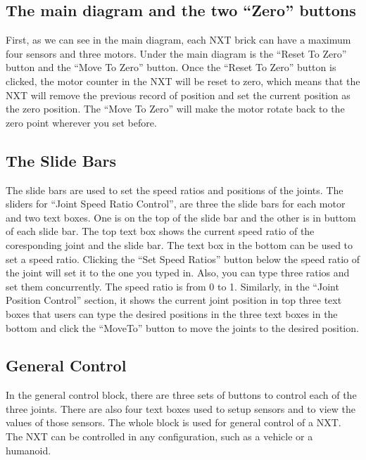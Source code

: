 \documentclass[11pt]{article}
\begin{document}
\subsection{The main diagram and the two ``Zero'' buttons
\label{sec:gui_maindiagram}}
First, as we can see in the main diagram, each NXT brick can have a maximum four
sensors and three motors. Under the main diagram is the ``Reset To Zero'' button
and the ``Move To Zero'' button. Once the ``Reset To Zero'' button is clicked, the
motor counter in the NXT will be reset to zero, which means that the NXT will 
remove the previous record of position and set the current position as the zero
position. The ``Move To Zero'' will make the motor rotate back to the zero point
wherever you set before. 

\subsection{The Slide Bars\label{sec:gui_speedjoint}}
The slide bars are used to set the speed ratios and positions of the joints. The
sliders for ``Joint Speed Ratio Control'', are three the slide bars for each motor 
and two text boxes. One is on the top of the slide bar and the other is in buttom 
of each slide bar. The top text box shows the current speed ratio of the 
coresponding joint and the slide bar. The text box in the bottom can be used to 
set a speed ratio. Clicking the ``Set Speed Ratios'' button below the speed ratio 
of the joint will set it to the one you typed in. Also, you can type three ratios 
and set them concurrently. The speed ratio is from 0 to 1. Similarly, in the 
``Joint Position Control'' section, it shows the current joint position in top three 
text boxes that users can type the desired positions in the three text boxes in 
the bottom and click the ``MoveTo'' button to move the joints to the desired position.

\subsection{General Control\label{sec:gui_generalcontrol}}
In the general control block, there are three sets of buttons to control each of 
the three joints. There are also four text boxes used to setup sensors and to 
view the values of those sensors. The whole block is used for general control of 
a NXT. The NXT can be controlled in any configuration, such as a vehicle or a 
humanoid.\\
\end{document}
